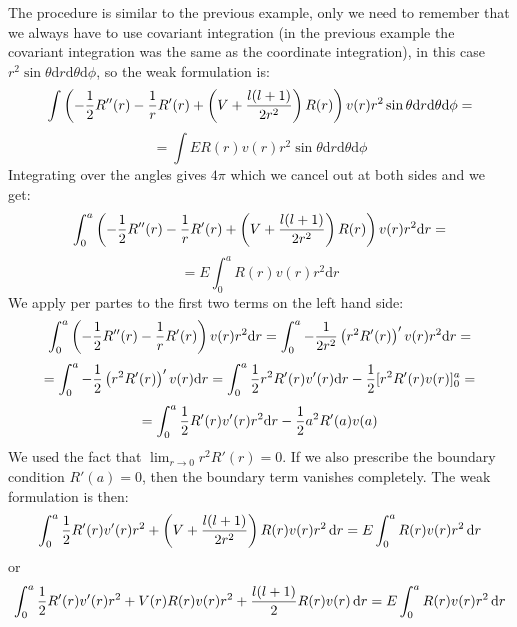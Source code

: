 \documentclass[12pt]{article}
\def\d{\mbox{d}}
\begin{document}
The procedure is similar to the previous example, only we need to remember that
we always have to use covariant integration (in the previous example the
covariant integration was the same as the coordinate integration),
in this case $r^2\sin\theta \d
r\d\theta\d\phi$, so the weak formulation is:
$$\int \left(-{1\over2}R''(r)-{1\over
r}R'(r)+\left(V+{l(l+1)\over2r^2}\right)R(r)\right)v(r)r^2\sin\theta \d
r\d\theta\d\phi=$$
$$
=\int ER(r) v(r)r^2\sin\theta \d r\d\theta\d\phi$$
Integrating over the angles gives $4\pi$ which we cancel out at both sides and
we get:
$$\int_0^a \left(-{1\over2}R''(r)-{1\over
r}R'(r)+\left(V+{l(l+1)\over2r^2}\right)R(r)\right)v(r)r^2 \d r=$$
$$
=E\int_0^a R(r) v(r)r^2 \d r$$
We apply per partes to the first two terms on the left hand side:
$$\int_0^a \left(-{1\over2}R''(r)-{1\over r}R'(r)\right)v(r)r^2 \d r
=\int_0^a -{1\over2r^2}\left(r^2 R'(r)\right)'v(r)r^2 \d r=
$$
$$
=\int_0^a -{1\over2}\left(r^2 R'(r)\right)'v(r) \d r
=\int_0^a {1\over2}r^2 R'(r)v'(r) \d r-{1\over2} [r^2R'(r)v(r)]_0^a=
$$
$$
=\int_0^a {1\over2} R'(r)v'(r) r^2\d r -{1\over2} a^2R'(a)v(a)
$$
We used the fact that $\lim_{r\to0} r^2 R'(r) = 0$. If we also prescribe the
boundary condition $R'(a)=0$, then the boundary term vanishes completely. The
weak formulation is then:
$$\int_0^a {1\over2}R'(r)v'(r)r^2+
\left(V+{l(l+1)\over2r^2}\right)R(r)v(r)r^2\,\d r
=
E\int_0^aR(r)v(r)r^2\,\d r
$$
or
$$\int_0^a {1\over2}R'(r)v'(r)r^2+
V(r)R(r)v(r)r^2+{l(l+1)\over2} R(r)v(r)\,\d r
=
E\int_0^aR(r)v(r)r^2\,\d r
$$
\end{document}
